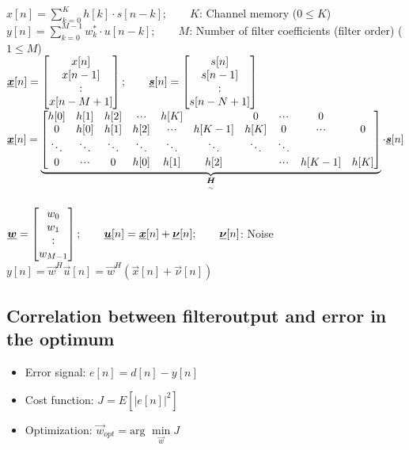 $x[n]=\sum\limits_{k=0}^{K} h[k] \cdot s[n-k]; \qquad K$: Channel memory ($0\leq K$)\\
$y[n]=\sum\limits_{k=0}^{M-1} w_k^* \cdot u[n-k]; \qquad M$: Number of filter coefficients (filter order) ($1\leq M$)\\

$\underline{\boldsymbol {x}}[n] = \begin{bmatrix} x[n]\\ x[n-1]\\ : \\ x[n-M+1] \end{bmatrix}; \qquad \underline{\boldsymbol {s}}[n]= \begin{bmatrix} s[n]\\ s[n-1]\\ : \\ s[n-N+1] \end{bmatrix}$\\

$\vec{x}[n] = \underbrace{\mat{h[0] & h[1] & h[2] & \shdots & h[K] & & 0 & \shdots & 0\\
													0 & h[0] & h[1] & h[2] & \shdots & h[K-1] & h[K] & 0 & \shdots & 0\\
													\ddots & \ddots & \ddots & \ddots & \ddots & \ddots & \ddots & \ddots & &\\
													0 & \shdots & 0 & h[0] & h[1] & h[2] & &\shdots & h[K-1] & h[K]}}_{\ma{H}} \cdot \vec{s}[n]$\\
 \\

$\underline{\boldsymbol {w}} = \begin{bmatrix} w_0\\ w_1\\ : \\w_{M-1} \end{bmatrix}; \qquad \underline{\boldsymbol {u}}[n]=\underline{\boldsymbol {x}}[n] + \underline{\boldsymbol {\nu}}[n]; \qquad \underline{\boldsymbol {\nu}}[n]$: Noise\\
$y[n] = \vec{w}^H \vec{u}[n] = \vec{w}^H(\vec{x}[n] + \vec{\nu}[n])$\\
\subsection{Correlation between filteroutput and error in the optimum}
\begin{itemize}
	\item Error signal: $e[n]=d[n] - y[n]$
	\item Cost function: $J=E[|e[n]|^2]$
	\item Optimization: $\vec{w}_{opt} = \text{arg } \min\limits_{\vec{w}} J$
\end{itemize}

